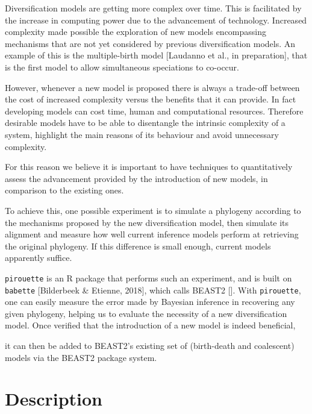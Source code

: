 \documentclass{article}
\begin{document}
Diversification models are getting more complex over time. 
This is facilitated by the increase in computing power due to the advancement of technology.
Increased complexity made possible the exploration of new models 
encompassing mechanisms that are not yet considered by previous diversification models. 
An example of this is the multiple-birth model [Laudanno et al., in preparation],
that is the first model to allow simultaneous speciations to co-occur.

However, whenever a new model is proposed there is always a trade-off 
between the cost of increased complexity versus the benefits that it can provide.
In fact developing models can cost time, human and computational resources.
Therefore desirable models have to be able to disentangle 
the intrinsic complexity of a system, 
highlight the main reasons of its behaviour and avoid unnecessary complexity. 

For this reason we believe it is important to have techniques 
to quantitatively assess the advancement provided by the introduction of new models, 
in comparison to the existing ones.

To achieve this, one possible experiment is to simulate a phylogeny 
according to the mechanisms proposed by the new diversification model, 
then simulate its alignment and measure how well current inference models perform 
at retrieving the original phylogeny.
If this difference is small enough, current models apparently
suffice.

\verb;pirouette; is an R package that performs such an experiment,
and is built on \verb;babette; [Bilderbeek \& Etienne, 2018], 
which calls BEAST2 [\cite{bouckaert2014beast}]. 
With \verb;pirouette;, one
can easily measure the error made by Bayesian inference in recovering
any given phylogeny, helping us to evaluate the necessity of a new diversification model.
Once verified that the introduction of a new model is indeed beneficial,

it can then be added to BEAST2's existing set of (birth-death and 
coalescent) models via the BEAST2 package system.

\section{Description}
\end{document}
